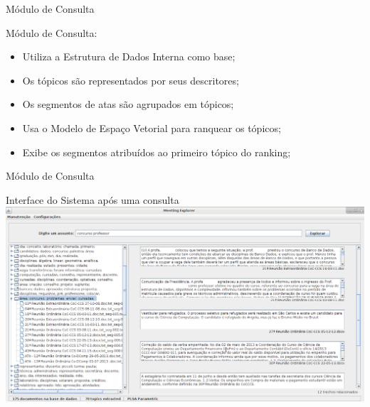 \documentclass[xcolor=table]{beamer}
\begin{document}
\begin{frame}{Módulo de Consulta}

	\nblock{ } {
		Módulo de Consulta:
		\begin{itemize}
			\item Utiliza a Estrutura de Dados Interna como base;
			\item Os tópicos são representados por seus descritores;
			\item Os segmentos de atas são agrupados em tópicos;
			\item Usa o Modelo de Espaço Vetorial para ranquear os tópicos;
			\item Exibe os segmentos atribuídos ao primeiro tópico do ranking;
		\end{itemize}
	}








\end{frame}


\begin{frame}{Módulo de Consulta}

	\center Interface do Sistema após uma consulta\\
	\vspace{.5cm}
		\includegraphics[width=\textwidth]{images/consulta.png}


\end{frame}
\end{document}
